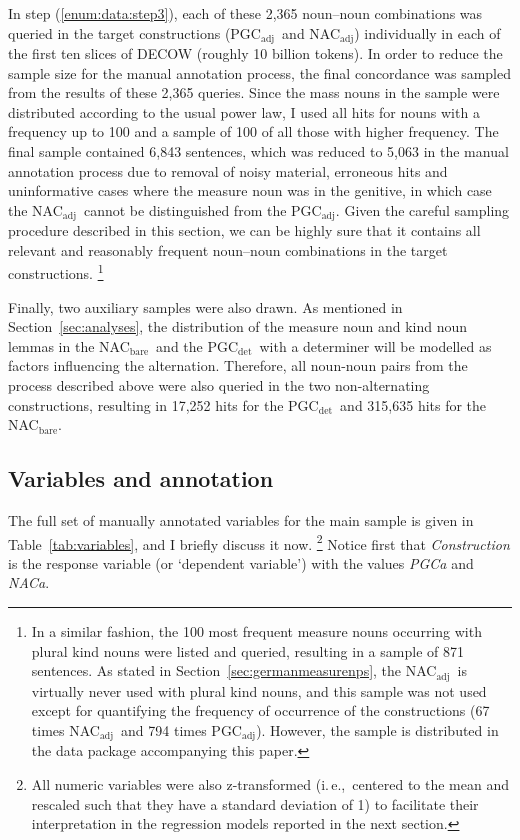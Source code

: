 \documentclass[USenglish]{article}
\newcommand{\ie}{i.\,e.,}
\newcommand{\Sub}[1]{\ensuremath{\mathrm{_{#1}}}}
\newcommand{\NACb}{NAC\Sub{bare}}
\newcommand{\NACa}{NAC\Sub{adj}}
\newcommand{\PGCd}{PGC\Sub{det}}
\newcommand{\PGCa}{PGC\Sub{adj}}
\begin{document}
In step (\ref{enum:data:step3}), each of these 2,365 noun–noun combinations was queried in the target constructions (\PGCa\ and \NACa) individually in each of the first ten slices of DECOW (roughly 10 billion tokens).
In order to reduce the sample size for the manual annotation process, the final concordance was sampled from the results of these 2,365 queries.
Since the mass nouns in the sample were distributed according to the usual power law, I used all hits for nouns with a frequency up to 100 and a sample of 100 of all those with higher frequency.
The final sample contained 6,843 sentences, which was reduced to 5,063 in the manual annotation process due to removal of noisy material, erroneous hits and uninformative cases where the measure noun was in the genitive, in which case the \NACa\ cannot be distinguished from the \PGCa.
Given the careful sampling procedure described in this section, we can be highly sure that it contains all relevant and reasonably frequent noun–noun combinations in the target constructions.%
\footnote{In a similar fashion, the 100 most frequent measure nouns occurring with plural kind nouns were listed and queried, resulting in a sample of 871 sentences.
As stated in Section~\ref{sec:germanmeasurenps}, the \NACa\ is virtually never used with plural kind nouns, and this sample was not used except for quantifying the frequency of occurrence of the constructions (67 times \NACa\ and 794 times \PGCa).
However, the sample is distributed in the data package accompanying this paper.
}

Finally, two auxiliary samples were also drawn.
As mentioned in Section~\ref{sec:analyses}, the distribution of the measure noun and kind noun lemmas in the \NACb\ and the \PGCd\ with a determiner will be modelled as factors influencing the alternation.
Therefore, all noun-noun pairs from the process described above were also queried in the two non-alternating constructions, resulting in 17,252 hits for the \PGCd\ and 315,635 hits for the \NACb.



\subsection{Variables and annotation}
\label{sec:annotation}

The full set of manually annotated variables for the main sample is given in Table~\ref{tab:variables}, and I briefly discuss it now.%
\footnote{All numeric variables were also z-transformed (\ie\ centered to the mean and rescaled such that they have a standard deviation of 1) to facilitate their interpretation in the regression models reported in the next section.}
Notice first that \textit{Construction} is the response variable (or `dependent variable') with the values \textit{PGCa} and \textit{NACa}.
\end{document}
